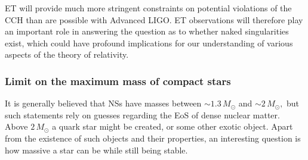 ET will provide much more stringent constraints on potential violations of the CCH than are possible with Advanced LIGO. ET observations will therefore play an important role in answering the question as to whether naked singularities exist, which could have profound implications for our understanding of various aspects of the theory of relativity.


\subsubsection{Limit on the maximum mass of compact stars}

It is generally believed that NSs have masses
between $\sim 1.3\,M_\odot$ and $\sim 2\,M_\odot,$ %
but such statements rely on guesses regarding the EoS of
dense nuclear matter. Above $2\,M_\odot$ a quark star might be created, or
some other exotic object.  Apart from the existence of such objects 
and their properties, an interesting question is how massive
a star can be while still being stable. 


